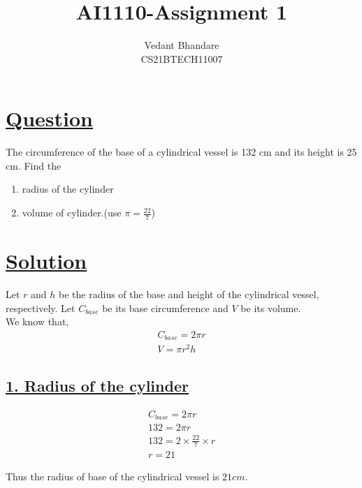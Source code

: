 \documentclass[journal,12pt,twocolumn]{IEEEtran}
\begin{document}
\raggedbottom
\setlength{\parindent}{0pt}
\vspace{3cm}
\title{AI1110-Assignment 1}
\author{Vedant Bhandare\\CS21BTECH11007}
\maketitle
\newpage
\bigskip
\renewcommand{\thefigure}{\theenumi}
\renewcommand{\thetable}{\theenumi}

\section*{\underline{\textbf{Question}}}
The circumference of the base of a cylindrical vessel is 132 cm and its height is 25 cm. Find the

\begin{enumerate}
    \item radius of the cylinder
    \item volume of cylinder.(use $\pi = \frac{22}{7}$)
\end{enumerate}
\section*{\underline{\textbf{Solution}}}
Let $r$ and $h$ be the radius of the base and height of the cylindrical vessel, respectively.
Let $C_{base}$ be its base circumference and $V$ be its volume.\\

We know that,
\begin{align}
    C_{base} = 2\pi{r}\\
    V = \pi{r^2h}
\end{align}

\subsection*{\underline{\textbf{1. Radius of the cylinder}}}
\begin{align}
C_{base} = 2\pi{r}\\
132 = 2\pi{r}\\
132 = 2\times\frac{22}{7}\times{r}\\
r = 21
\end{align}
\begin{center}
    Thus the radius of base of the cylindrical vessel is $21 cm$.
\end{center}
\end{document}
